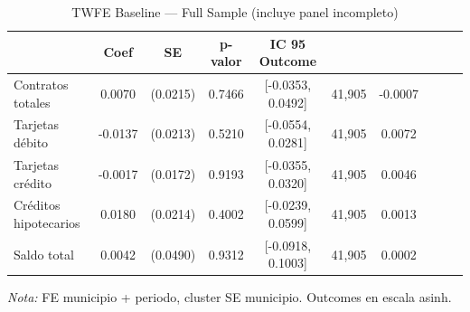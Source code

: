 \begin{table}[htbp]
\centering
\small
\caption{TWFE Baseline — Full Sample (incluye panel incompleto)}
\label{tab:twfe_full}
\begin{tabular}{lcccccc}
\toprule
 & Coef & SE & p-valor & IC 95%
Outcome &  &  &  &  &  &  \\
\midrule
Contratos totales & 0.0070 & (0.0215) & 0.7466 & [-0.0353, 0.0492] & 41,905 & -0.0007 \\
Tarjetas débito & -0.0137 & (0.0213) & 0.5210 & [-0.0554, 0.0281] & 41,905 & 0.0072 \\
Tarjetas crédito & -0.0017 & (0.0172) & 0.9193 & [-0.0355, 0.0320] & 41,905 & 0.0046 \\
Créditos hipotecarios & 0.0180 & (0.0214) & 0.4002 & [-0.0239, 0.0599] & 41,905 & 0.0013 \\
Saldo total & 0.0042 & (0.0490) & 0.9312 & [-0.0918, 0.1003] & 41,905 & 0.0002 \\
\bottomrule
\end{tabular}
\vspace{2mm}
\parbox{\textwidth}{\footnotesize \textit{Nota:} FE municipio + periodo, cluster SE municipio. Outcomes en escala asinh.}
\end{table}